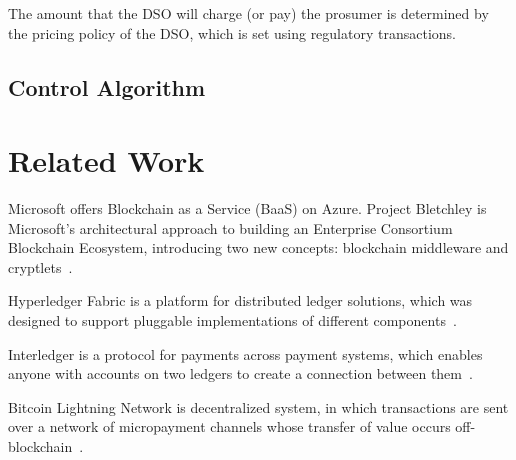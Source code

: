 \documentclass[sigconf]{acmart}
\begin{document}
The amount that the DSO will charge (or pay) the prosumer is determined by the pricing policy of the DSO, which is set using regulatory transactions.


\subsection{Control Algorithm}




\section{Related Work}

Microsoft offers Blockchain as a Service (BaaS) on Azure.
Project Bletchley is Microsoft's architectural approach to building an Enterprise Consortium Blockchain Ecosystem, introducing two new concepts: blockchain middleware and cryptlets~\cite{gray2016introducing}.

Hyperledger Fabric is a platform for distributed ledger solutions, which was designed to support pluggable implementations of different components~\cite{hyperledger2017fabric}.

Interledger is a protocol for payments across payment systems, which enables anyone with accounts on two ledgers to create
a connection between them~\cite{thomas_protocol}.

Bitcoin Lightning Network is decentralized system, in which transactions are sent over a network of micropayment channels whose transfer of value occurs off-blockchain~\cite{poon2016bitcoin}.




\end{document}
